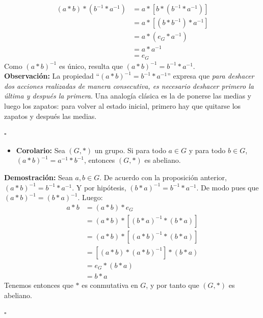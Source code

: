 \documentclass[10 pt]{article}
\begin{document}
\begin{align*}
    (a*b)*(b^{-1}*a^{-1})&=a*[b*(b^{-1}*a^{-1})] \\
    &=a*[(b*b^{-1})*a^{-1}] \\
    &=a*(e_G*a^{-1}) \\
    &=a*a^{-1} \\
    &=e_G
\end{align*}
\Large{Como $(a*b)^{-1}$ es único, resulta que $(a*b)^{-1}=b^{-1}*a^{-1}$.} \\

\Large{\textbf{Observación:} La propiedad ``$(a * b)^{-1}=b^{-1}*a^{-1}$'' expresa que \textit{para deshacer dos acciones realizadas de manera consecutiva, es necesario deshacer primero la última y después la primera}. Una analogía clásica es la de ponerse las medias y luego los zapatos: para volver al estado inicial, primero hay que quitarse los zapatos y después las medias.} \\

\begin{flushright}
    $\square$
\end{flushright}

\begin{itemize}
    \item \Large{\textbf{Corolario:} Sea $(G,*)$ un grupo. Si para todo $a \in G$ y para todo $b \in G$, $(a*b)^{-1}=a^{-1}*b^{-1}$, entonces $(G,*)$ es abeliano.} \\
\end{itemize}

\Large{\textbf{Demostración:} Sean $a,b \in G$. De acuerdo con la proposición anterior, $(a*b)^{-1}=b^{-1}*a^{-1}$. Y por hipótesis, $(b*a)^{-1}=b^{-1}*a^{-1}$. De modo pues que $(a*b)^{-1}=(b*a)^{-1}$. Luego:}
\begin{align*}
    a*b&=(a*b)*e_G \\
    &=(a*b)*[(b*a)^{-1}*(b*a)] \\
    &=(a*b)*[(a*b)^{-1}*(b*a)] \\
    &=[(a*b)*(a*b)^{-1}]*(b*a) \\
    &=e_G*(b*a) \\
    &=b*a
\end{align*}
\Large{Tenemos entonces que $*$ es conmutativa en $G$, y por tanto que $(G,*)$ es abeliano.} \\

\begin{flushright}
    $\square$
\end{flushright}
\end{document}
